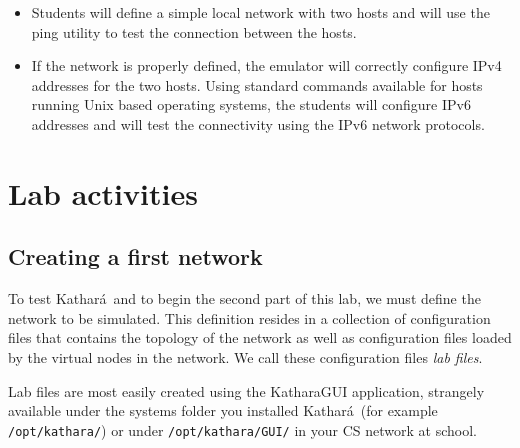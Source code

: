 \documentclass[12pt]{book}
\newcommand{\kathara}{Kathar\'a}
\begin{document}
\begin{itemize}[--]
\item Students will define a simple local network with
  two hosts and
  will use the ping utility to test the connection between the hosts.

\item If the network is properly defined, the emulator will correctly
  configure IPv4 addresses for the two hosts. Using standard commands
  available for hosts running Unix based operating systems, the
  students will configure IPv6 addresses and will test the
  connectivity using the IPv6 network protocols.

\end{itemize}


\section{Lab activities}


\subsection{Creating a first network}\label{2nodes.se}

To test \kathara\ and to begin the second part of this lab, we must
define the network to be simulated. This definition resides in a
collection of configuration files that contains the topology of the
network as well as configuration files loaded by the virtual nodes in
the network. We call these configuration files \emph{lab files}.

Lab files are most easily created using the KatharaGUI application,
strangely available under the systems folder you installed \kathara\ 
(for example \verb$/opt/kathara/$) 
or under \verb$/opt/kathara/GUI/$ in your CS network at school. 
\end{document}
